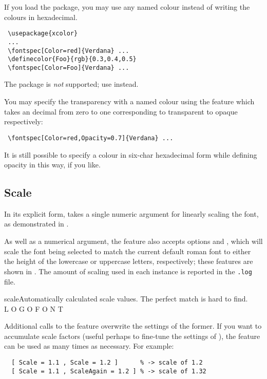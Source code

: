 \documentclass[a4paper]{l3doc}
\begin{document}
If you load the  package, you may use any named colour instead
of writing the colours in hexadecimal.
\begin{Verbatim}
 \usepackage{xcolor}
 ...
 \fontspec[Color=red]{Verdana} ...
 \definecolor{Foo}{rgb}{0.3,0.4,0.5}
 \fontspec[Color=Foo]{Verdana} ...
\end{Verbatim}
The  package is \emph{not} supported; use  instead.

You may specify the transparency with a named colour using the 
feature which takes an decimal from zero to one corresponding to
transparent to opaque respectively:
\begin{Verbatim}
 \fontspec[Color=red,Opacity=0.7]{Verdana} ...
\end{Verbatim}
It is still possible to specify a colour in six-char hexadecimal form
while defining opacity in this way, if you like.

\subsection{Scale}


In its explicit form,  takes a single
numeric argument for linearly scaling the font, as demonstrated
in .

As well as a numerical argument, the  feature
also accepts options 
and , which will scale the font being selected to match
the current default roman font to either the height of the lowercase or
uppercase letters, respectively; these features are shown in .
The amount of scaling used in each instance is reported in the \texttt{.log} file.

\begin{Xexample}{scale}{Automatically calculated scale values.}
  \setmainfont{Georgia}
  \newfontfamily{}
   The perfect match {\lc is hard to find.}\\
  \newfontfamily{}
   L O G O \uc F O N T
\end{Xexample}

Additional calls to the  feature overwrite the settings of the former.
If you want to accumulate scale factors (useful perhaps to fine-tune the settings of
), the  feature can be used as many times as
necessary. For example:
\begin{Verbatim}
  [ Scale = 1.1 , Scale = 1.2 ]      % -> scale of 1.2
  [ Scale = 1.1 , ScaleAgain = 1.2 ] % -> scale of 1.32
\end{Verbatim}
\end{document}
